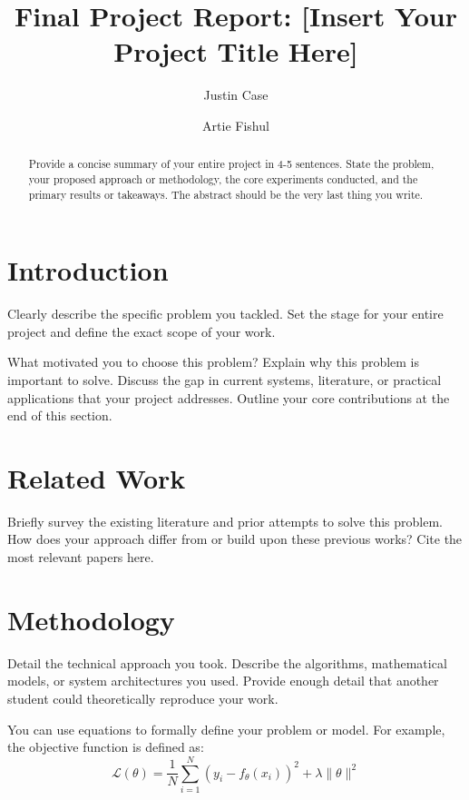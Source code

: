 \documentclass[11pt]{article}
\title{\textbf{Final Project Report: [Insert Your Project Title Here]}}
\author[1]{Justin Case}
\author[1]{Artie Fishul}
\affil[1]{Department of Computer Science, University of Wisconsin-Madison}
\date{\vspace{-5ex}}
\begin{document}
\maketitle

\begin{abstract}
Provide a concise summary of your entire project in 4-5 sentences. State the problem, your proposed approach or methodology, the core experiments conducted, and the primary results or takeaways. The abstract should be the very last thing you write.
\end{abstract}

\section{Introduction}
Clearly describe the specific problem you tackled. Set the stage for your entire project and define the exact scope of your work. 

What motivated you to choose this problem? Explain why this problem is important to solve. Discuss the gap in current systems, literature, or practical applications that your project addresses. Outline your core contributions at the end of this section.

\section{Related Work}
Briefly survey the existing literature and prior attempts to solve this problem. How does your approach differ from or build upon these previous works? Cite the most relevant papers here.

\section{Methodology}
Detail the technical approach you took. Describe the algorithms, mathematical models, or system architectures you used. Provide enough detail that another student could theoretically reproduce your work.

You can use equations to formally define your problem or model. For example, the objective function is defined as:
\begin{equation}
    \mathcal{L}(\theta) = \frac{1}{N} \sum_{i=1}^{N} \left( y_i - f_\theta(x_i) \right)^2 + \lambda \|\theta\|^2
    \label{eq:loss}
\end{equation}
\end{document}
